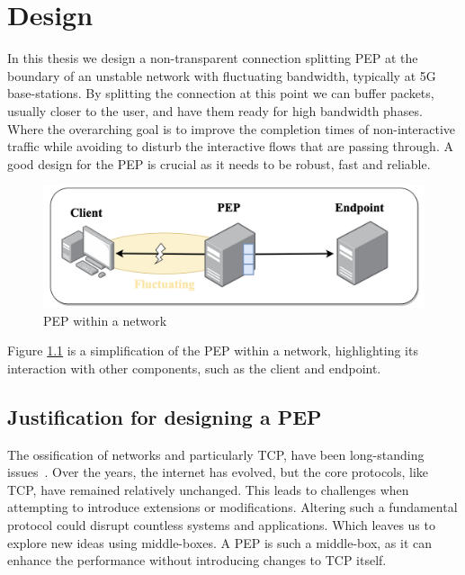 \documentclass[a4paper,english, 11pt]{report}
\begin{document}
\chapter{Design} %
In this thesis we design a non-transparent connection splitting PEP at the boundary of an unstable network with fluctuating bandwidth, typically at 5G base-stations. By splitting the connection at this point we can buffer packets, usually closer to the user, and have them ready for high bandwidth phases. Where the overarching goal is to improve the completion times of non-interactive traffic while avoiding to disturb the interactive flows that are passing through. A good design for the PEP is crucial as it needs to be robust, fast and reliable. \\

\begin{figure} %
	\centering
	\includegraphics[scale=0.45]{../diagrams/drawio/simple_pep_design.png}
  	\caption{PEP within a network}
  	\label{fig:simple_pep_design}
\end{figure}

Figure \ref{fig:simple_pep_design} is a simplification of the PEP within a network, highlighting its interaction with other components, such as the client and endpoint. 

\section{Justification for designing a PEP}
The ossification of networks and particularly TCP, have been long-standing issues~\cite{tcp_extendable}. Over the years, the internet has evolved, but the core protocols, like TCP, have remained relatively unchanged. This leads to challenges when attempting to introduce extensions or modifications. Altering such a fundamental protocol could disrupt countless systems and applications. Which leaves us to explore new ideas using middle-boxes. A PEP is such a middle-box, as it can enhance the performance without introducing changes to TCP itself.\\
\end{document}
